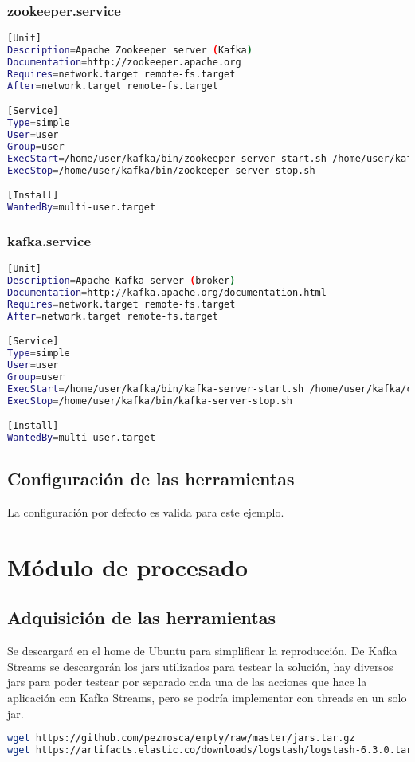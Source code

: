 \subsubsection{zookeeper.service}
\begin{lstlisting}[language=Bash, breaklines=true]
[Unit]
Description=Apache Zookeeper server (Kafka)
Documentation=http://zookeeper.apache.org
Requires=network.target remote-fs.target 
After=network.target remote-fs.target

[Service]
Type=simple
User=user
Group=user
ExecStart=/home/user/kafka/bin/zookeeper-server-start.sh /home/user/kafka/config/zookeeper.properties
ExecStop=/home/user/kafka/bin/zookeeper-server-stop.sh

[Install]
WantedBy=multi-user.target
\end{lstlisting}

\subsubsection{kafka.service}
\begin{lstlisting}[language=Bash, breaklines=true]
[Unit]
Description=Apache Kafka server (broker)
Documentation=http://kafka.apache.org/documentation.html
Requires=network.target remote-fs.target
After=network.target remote-fs.target

[Service]
Type=simple
User=user
Group=user
ExecStart=/home/user/kafka/bin/kafka-server-start.sh /home/user/kafka/config/server.properties
ExecStop=/home/user/kafka/bin/kafka-server-stop.sh

[Install]
WantedBy=multi-user.target
\end{lstlisting}

\subsection{Configuración de las herramientas}
La configuración por defecto es valida para este ejemplo.


\section{Módulo de procesado}
\subsection{Adquisición de las herramientas}
Se descargará en el home de Ubuntu para simplificar la reproducción. De Kafka Streams se descargarán los jars utilizados para testear la solución, hay diversos jars para poder testear por separado cada una de las acciones que hace la aplicación con Kafka Streams, pero se podría implementar con threads en un solo jar.
\begin{lstlisting}[language=Bash, breaklines=true]
wget https://github.com/pezmosca/empty/raw/master/jars.tar.gz
wget https://artifacts.elastic.co/downloads/logstash/logstash-6.3.0.tar.gz
\end{lstlisting}

